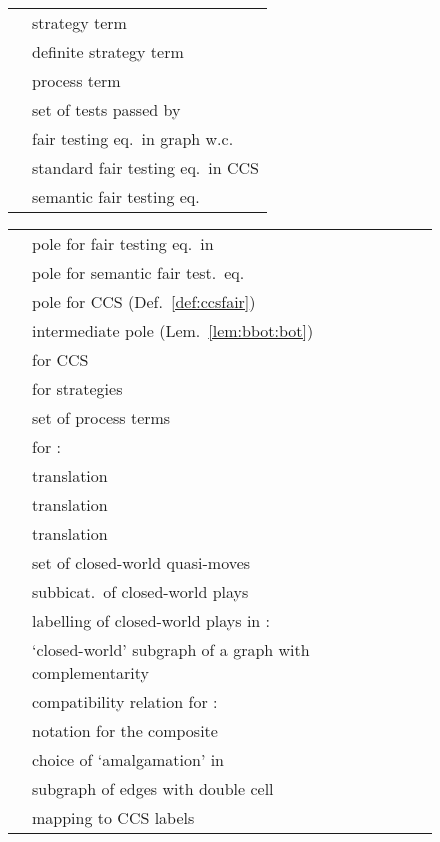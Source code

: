 \documentclass{LMCS}
\theoremstyle{plain}\newtheorem{satz}[thm]{Satz}
\begin{document}
\begin{figure}[p]
\begin{multicols}{2}
\begin{tabular}{lp{.8\linewidth}}
         & strategy term \\
         & definite strategy term \\
         & process term \\

         & set of tests passed by  \\

         & fair testing eq.\ in graph w.c.\  \\
         & standard fair testing eq.\ in CCS \\
         & semantic fair testing eq. \\

      \end{tabular}

      \begin{tabular}{lp{.7\linewidth}}

         & pole for fair testing eq.\ in  \\
         & pole for semantic fair test.\ eq. \\
         & pole for CCS (Def.~\ref{def:ccsfair}) \\
         & intermediate pole (Lem.~\ref{lem:bbot:bot}) \\


         & \lts{} for CCS \\
         & \lts{} for strategies \\
         & set of process terms \\
         & \lts{} for : {} \\
         & translation  \\
         & translation  \\
         & translation  \\

         & set of closed-world quasi-moves \\
         & subbicat.\ of closed-world plays \\
         &
        labelling of closed-world plays in :
         \\

         & `closed-world' subgraph of a graph with complementarity  \\
         & compatibility relation for :   \\
         & notation for the composite  \\

         & choice of `amalgamation' in  \\


 & subgraph of edges with double cell  \\
         & mapping to CCS labels \\
        

\end{tabular}
\end{multicols}
\end{figure}
\end{document}
